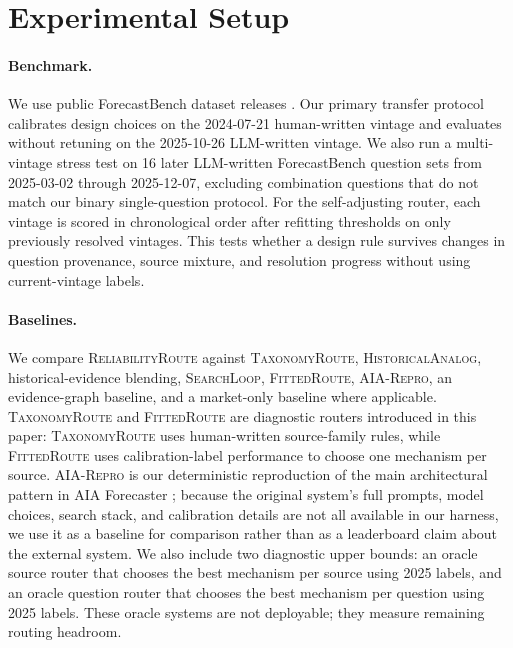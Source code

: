 \documentclass{article}
\newcommand{\tax}{\textsc{TaxonomyRoute}}
\newcommand{\rel}{\textsc{ReliabilityRoute}}
\newcommand{\fitroute}{\textsc{FittedRoute}}
\newcommand{\hist}{\textsc{HistoricalAnalog}}
\newcommand{\search}{\textsc{SearchLoop}}
\newcommand{\aialocal}{\textsc{AIA-Repro}}
\begin{document}
\section{Experimental Setup}
\label{sec:setup}

\paragraph{Benchmark.} We use public ForecastBench dataset releases \citep{karger2024forecastbench}. Our primary transfer protocol calibrates design choices on the 2024-07-21 human-written vintage and evaluates without retuning on the 2025-10-26 LLM-written vintage. We also run a multi-vintage stress test on 16 later LLM-written ForecastBench question sets from 2025-03-02 through 2025-12-07, excluding combination questions that do not match our binary single-question protocol. For the self-adjusting router, each vintage is scored in chronological order after refitting thresholds on only previously resolved vintages. This tests whether a design rule survives changes in question provenance, source mixture, and resolution progress without using current-vintage labels.

\paragraph{Baselines.} We compare \rel{} against \tax{}, \hist{}, historical-evidence blending, \search{}, \fitroute{}, \aialocal{}, an evidence-graph baseline, and a market-only baseline where applicable. \tax{} and \fitroute{} are diagnostic routers introduced in this paper: \tax{} uses human-written source-family rules, while \fitroute{} uses calibration-label performance to choose one mechanism per source. \aialocal{} is our deterministic reproduction of the main architectural pattern in AIA Forecaster \citep{alur2025aia}; because the original system's full prompts, model choices, search stack, and calibration details are not all available in our harness, we use it as a baseline for comparison rather than as a leaderboard claim about the external system. We also include two diagnostic upper bounds: an oracle source router that chooses the best mechanism per source using 2025 labels, and an oracle question router that chooses the best mechanism per question using 2025 labels. These oracle systems are not deployable; they measure remaining routing headroom.
\end{document}

